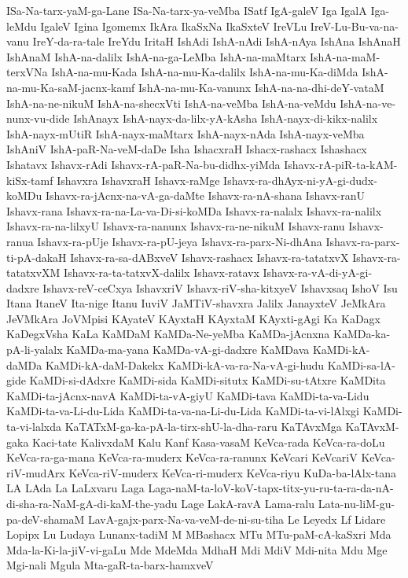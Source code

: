 {ISa-Na-tarx-yaM-ga-Lane
ISa-Na-tarx-ya-veMba
ISatf
IgA-galeV
Iga
IgalA
Iga-leMdu
IgaleV
Igina
Igomemx
IkAra
IkaSxNa
IkaSxteV
IreVLu
IreV-Lu-Bu-va-na-vanu
IreY-da-ra-tale
IreYdu
IritaH
IshAdi
IshA-nAdi
IshA-nAya
IshAna
IshAnaH
IshAnaM
IshA-na-dalilx
IshA-na-ga-LeMba
IshA-na-maMtarx
IshA-na-maM-terxVNa
IshA-na-mu-Kada
IshA-na-mu-Ka-dalilx
IshA-na-mu-Ka-diMda
IshA-na-mu-Ka-saM-jacnx-kamf
IshA-na-mu-Ka-vanunx
IshA-na-na-dhi-deY-vataM
IshA-na-ne-nikuM
IshA-na-shecxVti
IshA-na-veMba
IshA-na-veMdu
IshA-na-ve-nunx-vu-dide
IshAnayx
IshA-nayx-da-lilx-yA-kAsha
IshA-nayx-di-kikx-nalilx
IshA-nayx-mUtiR
IshA-nayx-maMtarx
IshA-nayx-nAda
IshA-nayx-veMba
IshAniV
IshA-paR-Na-veM-daDe
Isha
IshacxraH
Ishacx-rashacx
Ishashacx
Ishatavx
Ishavx-rAdi
Ishavx-rA-paR-Na-bu-didhx-yiMda
Ishavx-rA-piR-ta-kAM-kiSx-tamf
Ishavxra
IshavxraH
Ishavx-raMge
Ishavx-ra-dhAyx-ni-yA-gi-dudx-koMDu
Ishavx-ra-jAcnx-na-vA-ga-daMte
Ishavx-ra-nA-shana
Ishavx-ranU
Ishavx-rana
Ishavx-ra-na-La-va-Di-si-koMDa
Ishavx-ra-nalalx
Ishavx-ra-nalilx
Ishavx-ra-na-lilxyU
Ishavx-ra-nanunx
Ishavx-ra-ne-nikuM
Ishavx-ranu
Ishavx-ranua
Ishavx-ra-pUje
Ishavx-ra-pU-jeya
Ishavx-ra-parx-Ni-dhAna
Ishavx-ra-parx-ti-pA-dakaH
Ishavx-ra-sa-dABxveV
Ishavx-rashacx
Ishavx-ra-tatatxvX
Ishavx-ra-tatatxvXM
Ishavx-ra-ta-tatxvX-dalilx
Ishavx-ratavx
Ishavx-ra-vA-di-yA-gi-dadxre
Ishavx-reV-ceCxya
IshavxriV
Ishavx-riV-sha-kitxyeV
Ishavxsaq
IshoV
Isu
Itana
ItaneV
Ita-nige
Itanu
IuviV
JaMTiV-shavxra
Jalilx
JanayxteV
JeMkAra
JeVMkAra
JoVMpisi
KAyateV
KAyxtaH
KAyxtaM
KAyxti-gAgi
Ka
KaDagx
KaDegxVsha
KaLa
KaMDaM
KaMDa-Ne-yeMba
KaMDa-jAcnxna
KaMDa-ka-pA-li-yalalx
KaMDa-ma-yana
KaMDa-vA-gi-dadxre
KaMDava
KaMDi-kA-daMDa
KaMDi-kA-daM-Dakekx
KaMDi-kA-va-ra-Na-vA-gi-hudu
KaMDi-sa-lA-gide
KaMDi-si-dAdxre
KaMDi-sida
KaMDi-situtx
KaMDi-su-tAtxre
KaMDita
KaMDi-ta-jAcnx-navA
KaMDi-ta-vA-giyU
KaMDi-tava
KaMDi-ta-va-Lidu
KaMDi-ta-va-Li-du-Lida
KaMDi-ta-va-na-Li-du-Lida
KaMDi-ta-vi-lAlxgi
KaMDi-ta-vi-lalxda
KaTATxM-ga-ka-pA-la-tirx-shU-la-dha-raru
KaTAvxMga
KaTAvxM-gaka
Kaci-tate
KalivxdaM
Kalu
Kanf
Kasa-vasaM
KeVca-rada
KeVca-ra-doLu
KeVca-ra-ga-mana
KeVca-ra-muderx
KeVca-ra-ranunx
KeVcari
KeVcariV
KeVca-riV-mudArx
KeVca-riV-muderx
KeVca-ri-muderx
KeVca-riyu
KuDa-ba-lAlx-tana
LA
LAda
La
LaLxvaru
Laga
Laga-naM-ta-loV-koV-tapx-titx-yu-ru-ta-ra-da-nA-di-sha-ra-NaM-gA-di-kaM-the-yadu
Lage
LakA-ravA
Lama-ralu
Lata-nu-liM-gu-pa-deV-shamaM
LavA-gajx-parx-Na-va-veM-de-ni-su-tiha
Le
Leyedx
Lf
Lidare
Lopipx
Lu
Ludaya
Lunanx-tadiM
M
MBashacx
MTu
MTu-paM-cA-kaSxri
Mda
Mda-la-Ki-la-jiV-vi-gaLu
Mde
MdeMda
MdhaH
Mdi
MdiV
Mdi-nita
Mdu
Mge
Mgi-nali
Mgula
Mta-gaR-ta-barx-hamxveV
}
